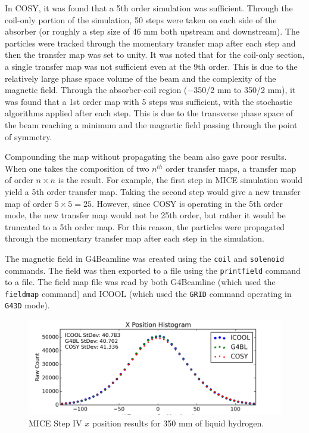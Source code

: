 \documentclass[a4paper,11pt]{article}
\begin{document}
In COSY, it was found that a 5th order simulation was sufficient. Through the coil-only portion of the simulation, 50 steps were taken on each side of the absorber (or roughly a step size of 46 mm both upstream and downstream). The particles were tracked through the momentary transfer map after each step and then the transfer map was set to unity. It was noted that for the coil-only section, a single transfer map was not sufficient even at the 9th order. This is due to the relatively large phase space volume of the beam and the complexity of the magnetic field. Through the absorber-coil region ($-$350/2 mm to 350/2 mm), it was found that a 1st order map with 5 steps was sufficient, with the stochastic algorithms applied after each step. This is due to the transverse phase space of the beam reaching a minimum and the magnetic field passing through the point of symmetry.

Compounding the map without propagating the beam also gave poor results. When one takes the composition of two $n^{th}$ order transfer maps, a transfer map of order $n\times n$ is the result. For example, the first step in MICE simulation would yield a 5th order transfer map. Taking the second step would give a new transfer map of order $5\times 5 = 25$. However, since COSY is operating in the 5th order mode, the new transfer map would not be 25th order, but rather it would be truncated to a 5th order map. For this reason, the particles were propagated through the momentary transfer map after each step in the simulation.

The magnetic field in G4Beamline was created using the \texttt{coil} and \texttt{solenoid} commands. The field was then exported to a file using the \texttt{printfield} command to a file. The field map file was read by both G4Beamline (which used the \texttt{fieldmap} command) and ICOOL (which used the \texttt{GRID} command operating in \texttt{G43D} mode).

\iffalse
\begin{figure}[htb]
  \centering
    \includegraphics[width=\columnwidth]{x} 
  \caption{MICE Step IV $x$ position results for 350 mm of liquid hydrogen.}
  \label{fig:micex}
\end{figure}
\end{document}
